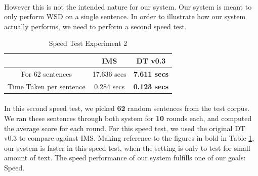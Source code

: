 \paragraph{}
However this is not the intended nature for our system. Our system is meant to only perform WSD on a single sentence. In order to illustrate how our system actually performs, we need to perform a second speed test.

\begin{table}[h]
\center
\begin{tabular}{| c | c | c |}
\hline
& IMS & DT v0.3 \\
\hline
For 62 sentences & 17.636 secs & \textbf{\large{7.611 secs}} \\
\hline
Time Taken per sentence & 0.284 secs & \textbf{\large{0.123 secs}} \\
\hline
\end{tabular}
\caption{Speed Test Experiment 2}
\label{tab:speedTest2}
\end{table}

\paragraph{}
In this second speed test, we picked \textbf{62} random sentences from the test corpus. We ran these sentences through both system for \textbf{10} rounds each, and computed the average score for each round. For this speed test, we used the original DT v0.3 to compare against IMS. Making reference to the figures in bold in Table \ref{tab:speedTest2}, our system is faster in this speed test, when the setting is only to test for small amount of text. The speed performance of our system fulfills one of our goals: Speed. 